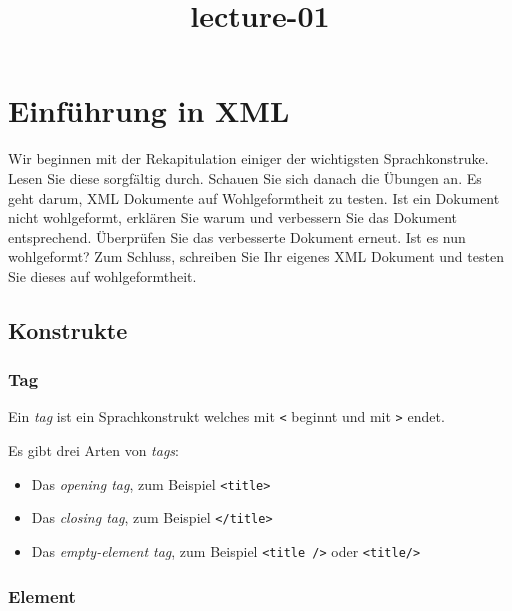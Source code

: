 \documentclass[11pt]{article}
\title{lecture-01}
\providecommand{\tightlist}{%
      \setlength{\itemsep}{0pt}\setlength{\parskip}{0pt}}
\begin{document}
    
    
    \maketitle
    
    

    
    \section{Einführung in XML}\label{einfuxfchrung-in-xml}

    Wir beginnen mit der Rekapitulation einiger der wichtigsten
Sprachkonstruke. Lesen Sie diese sorgfältig durch. Schauen Sie sich
danach die Übungen an. Es geht darum, XML Dokumente auf Wohlgeformtheit
zu testen. Ist ein Dokument nicht wohlgeformt, erklären Sie warum und
verbessern Sie das Dokument entsprechend. Überprüfen Sie das verbesserte
Dokument erneut. Ist es nun wohlgeformt? Zum Schluss, schreiben Sie Ihr
eigenes XML Dokument und testen Sie dieses auf wohlgeformtheit.

    \subsection{Konstrukte}\label{konstrukte}

    \subsubsection{Tag}\label{tag}

Ein \emph{tag} ist ein Sprachkonstrukt welches mit \texttt{\textless{}}
beginnt und mit \texttt{\textgreater{}} endet.

Es gibt drei Arten von \emph{tags}:

\begin{itemize}
\tightlist
\item
  Das \emph{opening tag}, zum Beispiel
  \texttt{\textless{}title\textgreater{}}
\item
  Das \emph{closing tag}, zum Beispiel
  \texttt{\textless{}/title\textgreater{}}
\item
  Das \emph{empty-element tag}, zum Beispiel
  \texttt{\textless{}title\ /\textgreater{}} oder
  \texttt{\textless{}title/\textgreater{}}
\end{itemize}

    \subsubsection{Element}\label{element}
\end{document}
